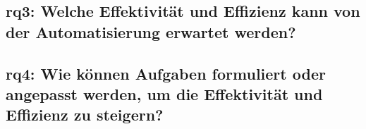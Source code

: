 \subsection[\acs{rq}3]{\ac{rq}3: Welche Effektivität und Effizienz kann von der Automatisierung erwartet werden?}\label{subsec:ra3-effectivity-efficiency}

\subsection[\acs{rq}4]{\ac{rq}4: Wie können Aufgaben formuliert oder angepasst werden, um die Effektivität und Effizienz zu steigern?}\label{subsec:ra4-improve-effectivity-efficiency}

